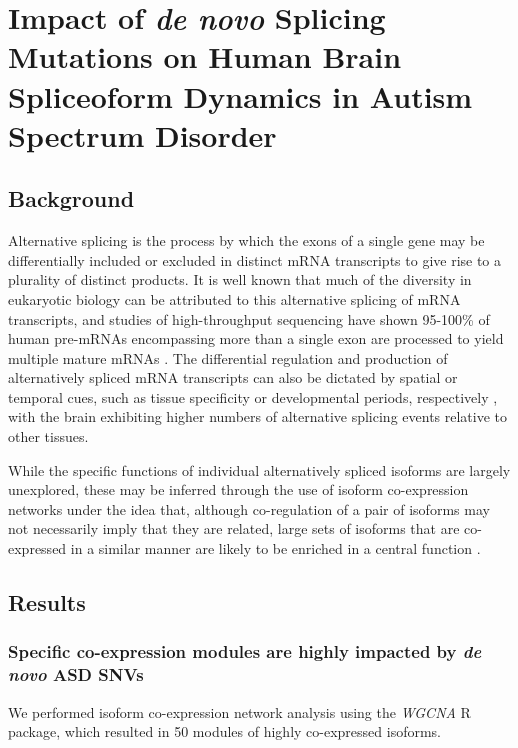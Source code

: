 \chapter{Impact of \textit{de novo} Splicing Mutations on Human Brain Spliceoform Dynamics in Autism Spectrum Disorder}
\section{Background}
Alternative splicing is the process by which the exons of a single gene may be differentially included or excluded in distinct mRNA transcripts to give rise to a plurality of distinct products. It is well known that much of the diversity in eukaryotic biology can be attributed to this alternative splicing of mRNA transcripts, and studies of high-throughput sequencing have shown 95-100\% of human pre-mRNAs encompassing more than a single exon are processed to yield multiple mature mRNAs \cite{Pan2008, Wang2008}. The differential regulation and production of alternatively spliced mRNA transcripts can also be dictated by spatial or temporal cues, such as tissue specificity or developmental periods, respectively \cite{Nilsen2010, Porter2018}, with the brain exhibiting higher numbers of alternative splicing events relative to other tissues\cite{Pan2008, Yeo2004, Xu2002}.\par

While the specific functions of individual alternatively spliced isoforms are largely unexplored, these may be inferred through the use of isoform co-expression networks under the idea that, although co-regulation of a pair of isoforms may not necessarily imply that they are related, large sets of isoforms that are co-expressed in a similar manner are likely to be enriched in a central function \cite{Carter2004, Stuart2003}. 

\section{Results}

\subsection{Specific co-expression modules are highly impacted by \textit{de novo} ASD SNVs}

We performed isoform co-expression network analysis using the \textit{WGCNA} R package, which resulted in 50 modules of highly co-expressed isoforms. 


